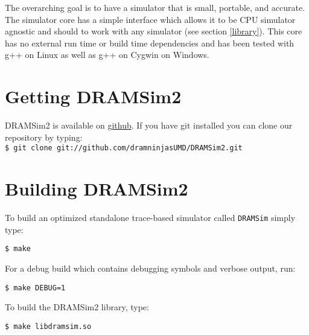\documentclass[11pt]{article}
\begin{document}
  The overarching goal is to have a simulator that is small,
  portable, and accurate. The simulator core has a simple interface 
  which allows it to be CPU simulator agnostic and should to work with any simulator (see section \ref{library}).  This core has no external run
  time or build time dependencies and has been tested with g++ on Linux
  as well as g++ on Cygwin on Windows.  

\section{Getting DRAMSim2}

DRAMSim2 is available on \href{http://github.com/dramninjasUMD}{github}. If you have git installed you can clone our repository by typing:\\

\texttt{\$ git clone git://github.com/dramninjasUMD/DRAMSim2.git }



\section{Building DRAMSim2}
  To build an optimized standalone trace-based simulator called \texttt{DRAMSim} simply type:

  \texttt{\$ make}

  For a debug build which contains debugging symbols and verbose output, run:

  \texttt{\$ make DEBUG=1}

  To build the DRAMSim2 library, type: 

  \texttt{\$ make libdramsim.so }
\end{document}
